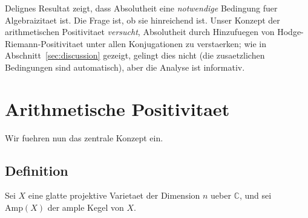\documentclass[aps,prd,twocolumn,superscriptaddress,nofootinbib]{revtex4-2}
\theoremstyle{definition}
\theoremstyle{remark}
\begin{document}
Delignes Resultat zeigt, dass Absolutheit eine \textit{notwendige} Bedingung fuer Algebraizitaet ist. Die Frage ist, ob sie hinreichend ist. Unser Konzept der arithmetischen Positivitaet \textit{versucht}, Absolutheit durch Hinzufuegen von Hodge-Riemann-Positivitaet unter allen Konjugationen zu verstaerken; wie in Abschnitt~\ref{sec:discussion} gezeigt, gelingt dies nicht (die zusaetzlichen Bedingungen sind automatisch), aber die Analyse ist informativ.


\section{Arithmetische Positivitaet}
\label{sec:arithmetic_positivity}

Wir fuehren nun das zentrale Konzept ein.

\subsection{Definition}

Sei $X$ eine glatte projektive Varietaet der Dimension $n$ ueber $\mathbb{C}$, und sei $\mathrm{Amp}(X)$ der ample Kegel von $X$.
\end{document}
